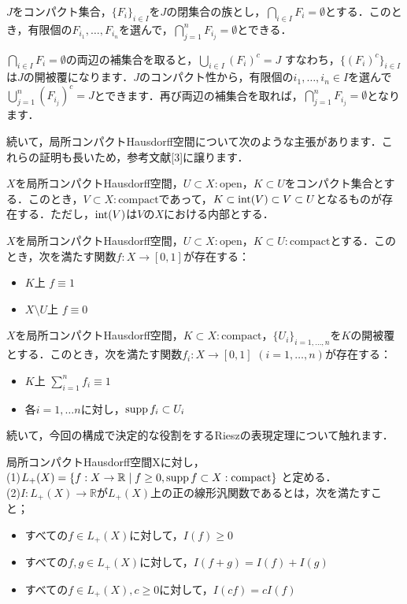 \begin{ylem}\label{4}
$J$をコンパクト集合，$\{ F_i \}_{i \in I}$を$J$の閉集合の族とし，$\bigcap_{i \in I}F_i = \emptyset$とする．このとき，有限個の$F_{i_1}, \ldots , F_{i_n}$を選んで，$\bigcap_{j=1}^{n}F_{i_j} = \emptyset$とできる．
\end{ylem}
\begin{Proof}
$\bigcap_{i \in I}F_i = \emptyset$の両辺の補集合を取ると，$\bigcup_{i \in I} (F_i)^{c} = J$ すなわち，$\{ (F_i)^{c} \}_{i \in I}$は$J$の開被覆になります．$J$のコンパクト性から，有限個の$i_1, \ldots , i_n \in I$を選んで$\bigcup_{j=1}^{n}(F_{i_j})^{c} = J$とできます．再び両辺の補集合を取れば，$\bigcap_{j=1}^{n}F_{i_j} = \emptyset$となります．
\end{Proof}
続いて，局所コンパクトHausdorff空間について次のような主張があります．これらの証明も長いため，参考文献[3]に譲ります．
\begin{ythm}\label{5}
$X$を局所コンパクトHausdorff空間，$U \subset X : \mathrm{open}$，$K \subset U$をコンパクト集合とする．このとき，$V \subset X :\mathrm{compact}$であって，$K \subset \operatorname{int}(V) \subset V \subset U$となるものが存在する．ただし，$\operatorname{int}(V)$は$V$の$X$における内部とする．
\end{ythm}
\begin{ythm}[Urysohnの補題]\label{6}
$X$を局所コンパクトHausdorff空間，$U \subset X : \mathrm{open}$，$K \subset U : \mathrm{compact}$とする．このとき，次を満たす関数$f : X \to [0, 1]$が存在する：
\begin{itemize}
 \item $K$上 $f \equiv 1$
 \item $X \setminus U$上 $f \equiv 0$
\end{itemize}
\end{ythm}
\begin{ythm}[1の分割]\label{7}
$X$を局所コンパクトHausdorff空間，$K \subset X : \mathrm{compact}$，$\{ U_i \}_{i=1, \ldots , n}$を$K$の開被覆とする．このとき，次を満たす関数$f_i : X \to [0,1]$ $(i=1, \ldots , n)$が存在する：
\begin{itemize}
 \item $K$上 $\sum_{i=1}^{n}f_i \equiv 1$
 \item 各$i=1, \ldots n$に対し，$\operatorname{supp} f_i \subset U_i$
\end{itemize}
\end{ythm}
続いて，今回の構成で決定的な役割をするRieszの表現定理について触れます．
\begin{ydefi}\label{8}
局所コンパクトHausdorff空間Xに対し， \\
 (1)$L_{+}(X)= \{ f : X \to \mathbb{R} \mid f \ge 0, \operatorname{supp} f \subset X : \mathrm{compact}\}$ と定める． \\
 (2)$I : L_{+}(X) \to \mathbb{R}$が$L_{+}(X)$上の正の線形汎関数であるとは，次を満たすこと；
\begin{itemize}
 \item すべての$f \in L_{+}(X)$に対して，$I(f) \ge 0$
 \item すべての$f,g \in L_{+}(X)$に対して，$I(f+g)=I(f)+I(g)$
 \item すべての$f \in L_{+}(X), c \ge 0$に対して，$I(cf)=cI(f)$
\end{itemize}
\end{ydefi}
